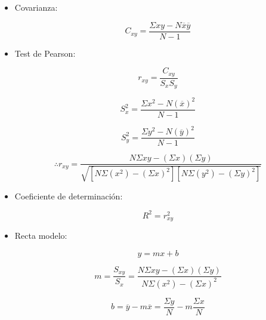 \documentclass[conference]{IEEEtran}
\begin{document}
\begin{itemize}
	\item Covarianza:

	      \begin{equation}
		      C_{xy} = \frac{\Sigma xy - N \overline{x}  \overline{y} }{N - 1}
	      \end{equation}

	\item Test de Pearson:

	      \begin{equation}
		      r_{xy} = \frac{C_{xy}}{S_{x} S_{y}}
	      \end{equation}

	      \begin{equation}
		      S_{x}^{2} = \frac{\Sigma x^{2} - N {(\overline{x})}^{2}}{N - 1}
	      \end{equation}

	      \begin{equation}
		      S_{y}^{2} = \frac{\Sigma y^{2} - N {(\overline{y})}^{2}}{N - 1}
	      \end{equation}

	      \begin{equation}
		      \therefore r_{xy} = \frac{N \Sigma xy - (\Sigma x) (\Sigma y)}{\sqrt{[N \Sigma (x^{2}) - {(\Sigma x)}^{2}] [N \Sigma (y^{2}) - {(\Sigma y)}^{2}]}}
		      \label{eq:pearson_coefficient}
	      \end{equation}


	\item Coeficiente de determinación:

	      \begin{equation}
		      R^{2} = r_{xy}^{2}
		      \label{eq:r2}
	      \end{equation}


	\item Recta modelo:

	      \begin{equation}
		      y = mx + b
	      \end{equation}


	      \begin{equation}
		      m = \frac{S_{xy}}{S_{x}} = \frac{N \Sigma xy - (\Sigma x)(\Sigma y)}{N \Sigma (x^{2}) - {(\Sigma x)}^{2}}
		      \label{eq:m}
	      \end{equation}

	      \begin{equation}
		      b = \overline{y} - \textit{m} \overline{x} = \frac{\Sigma y}{N} - \textit{m} \frac{\Sigma x}{N}
		      \label{eq:b}
	      \end{equation}
\end{itemize}
\end{document}
